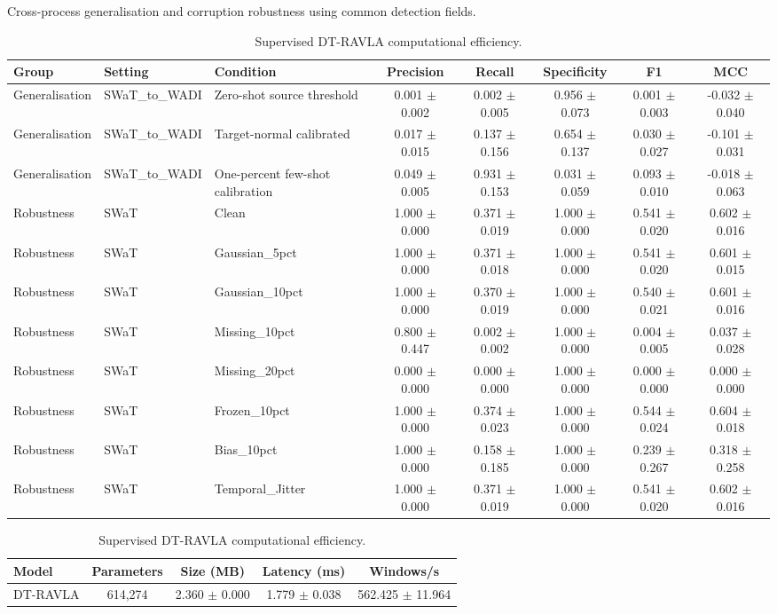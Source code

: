 \begin{table}[t]
\begin{subtable}{\textwidth}
\centering
\caption{Cross-process generalisation and corruption robustness using common detection fields.}
\label{tab:generalisation_robustness_subtable}
\begin{tabular}{lllccccc}
\hline
Group & Setting & Condition & Precision & Recall & Specificity & F1 & MCC \\
\hline
Generalisation & SWaT\_to\_WADI & Zero-shot source threshold & 0.001 $\pm$ 0.002 & 0.002 $\pm$ 0.005 & 0.956 $\pm$ 0.073 & 0.001 $\pm$ 0.003 & -0.032 $\pm$ 0.040 \\
Generalisation & SWaT\_to\_WADI & Target-normal calibrated & 0.017 $\pm$ 0.015 & 0.137 $\pm$ 0.156 & 0.654 $\pm$ 0.137 & 0.030 $\pm$ 0.027 & -0.101 $\pm$ 0.031 \\
Generalisation & SWaT\_to\_WADI & One-percent few-shot calibration & 0.049 $\pm$ 0.005 & 0.931 $\pm$ 0.153 & 0.031 $\pm$ 0.059 & 0.093 $\pm$ 0.010 & -0.018 $\pm$ 0.063 \\
Robustness & SWaT & Clean & 1.000 $\pm$ 0.000 & 0.371 $\pm$ 0.019 & 1.000 $\pm$ 0.000 & 0.541 $\pm$ 0.020 & 0.602 $\pm$ 0.016 \\
Robustness & SWaT & Gaussian\_5pct & 1.000 $\pm$ 0.000 & 0.371 $\pm$ 0.018 & 1.000 $\pm$ 0.000 & 0.541 $\pm$ 0.020 & 0.601 $\pm$ 0.015 \\
Robustness & SWaT & Gaussian\_10pct & 1.000 $\pm$ 0.000 & 0.370 $\pm$ 0.019 & 1.000 $\pm$ 0.000 & 0.540 $\pm$ 0.021 & 0.601 $\pm$ 0.016 \\
Robustness & SWaT & Missing\_10pct & 0.800 $\pm$ 0.447 & 0.002 $\pm$ 0.002 & 1.000 $\pm$ 0.000 & 0.004 $\pm$ 0.005 & 0.037 $\pm$ 0.028 \\
Robustness & SWaT & Missing\_20pct & 0.000 $\pm$ 0.000 & 0.000 $\pm$ 0.000 & 1.000 $\pm$ 0.000 & 0.000 $\pm$ 0.000 & 0.000 $\pm$ 0.000 \\
Robustness & SWaT & Frozen\_10pct & 1.000 $\pm$ 0.000 & 0.374 $\pm$ 0.023 & 1.000 $\pm$ 0.000 & 0.544 $\pm$ 0.024 & 0.604 $\pm$ 0.018 \\
Robustness & SWaT & Bias\_10pct & 1.000 $\pm$ 0.000 & 0.158 $\pm$ 0.185 & 1.000 $\pm$ 0.000 & 0.239 $\pm$ 0.267 & 0.318 $\pm$ 0.258 \\
Robustness & SWaT & Temporal\_Jitter & 1.000 $\pm$ 0.000 & 0.371 $\pm$ 0.019 & 1.000 $\pm$ 0.000 & 0.541 $\pm$ 0.020 & 0.602 $\pm$ 0.016 \\
\hline
\end{tabular}
\end{subtable}
\vspace{1.5mm}

\begin{subtable}{0.78\textwidth}
\centering
\caption{Supervised DT-RAVLA computational efficiency.}
\label{tab:efficiency_subtable}
\begin{tabular}{lcccc}
\hline
Model & Parameters & Size (MB) & Latency (ms) & Windows/s \\
\hline
DT-RAVLA & 614,274 & 2.360 $\pm$ 0.000 & 1.779 $\pm$ 0.038 & 562.425 $\pm$ 11.964 \\
\hline
\end{tabular}
\end{subtable}

\end{table}